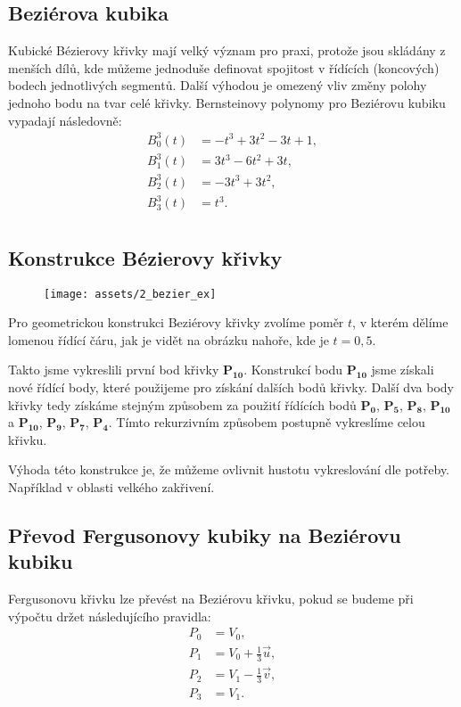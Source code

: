 \subsection{Beziérova kubika}
Kubické Bézierovy křivky mají velký význam pro praxi, protože jsou skládány z menších dílů, kde můžeme jednoduše definovat spojitost v řídících (koncových) bodech jednotlivých segmentů. Další výhodou je omezený vliv změny polohy jednoho bodu na tvar celé křivky. Bernsteinovy polynomy pro Beziérovu kubiku vypadají následovně:
\begin{equation*} \label{rovnice_bezier_kubika}
    \begin{split}
        B_0^3(t) &= -t^3 + 3t^2 - 3t + 1,\\
        B_1^3(t) &= 3t^3 - 6t^2 + 3t,\\
        B_2^3(t) &= -3t^3 + 3t^2,\\
        B_3^3(t) &= t^3.\\
    \end{split}
\end{equation*}

\subsection{Konstrukce Bézierovy křivky}
\begin{figure}[H]
    \centering
    \texttt{[image: assets/2\_bezier\_ex]}
\end{figure}
Pro geometrickou konstrukci Beziérovy křivky zvolíme poměr $ t $, v kterém dělíme lomenou řídící čáru, jak je vidět na obrázku nahoře, kde je $t=0,5$.

Takto jsme vykreslili první bod křivky $\mathbf{P_10}$. Konstrukcí bodu $\mathbf{P_10}$ jsme získali nové řídící body, které použijeme pro získání dalších bodů křivky. Další dva body křivky tedy získáme stejným způsobem za použití řídících bodů {$\mathbf{P_0}$, $\mathbf{P_5}$, $\mathbf{P_8}$, $\mathbf{P_10}$} a {$\mathbf{P_10}$, $\mathbf{P_9}$, $\mathbf{P_7}$, $\mathbf{P_4}$}. Tímto rekurzivním způsobem postupně vykreslíme celou křivku.

Výhoda této konstrukce je, že můžeme ovlivnit hustotu vykreslování dle potřeby. Například v oblasti velkého zakřivení.

\subsection{Převod Fergusonovy kubiky na Beziérovu kubiku}
Fergusonovu křivku lze převést na Beziérovu křivku, pokud se budeme při výpočtu držet následujícího pravidla:
\begin{equation*}\label{prevodfergusbezier}
    \begin{split}
        P_0 &= V_0,\\
        P_1 &= V_0 + \frac{1}{3}\vec{u},\\
        P_2 &= V_1 - \frac{1}{3}\vec{v},\\
        P_3 &= V_1.\\
    \end{split}
\end{equation*}

